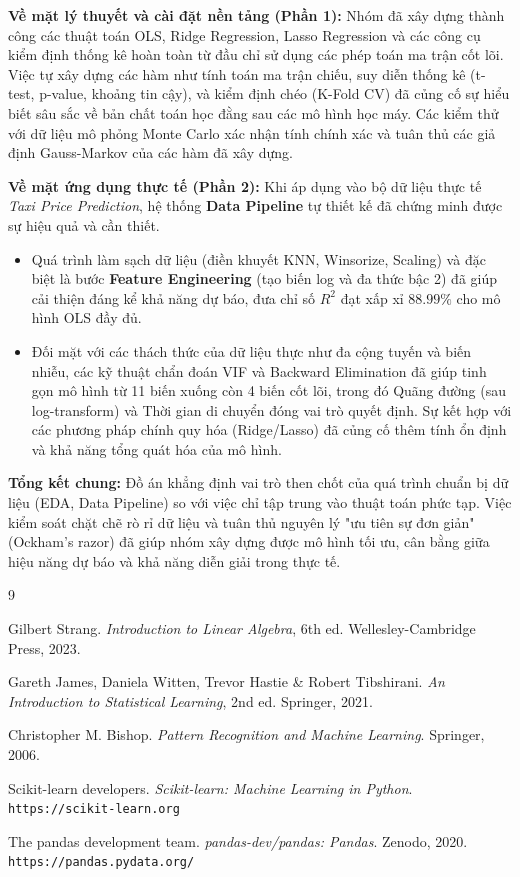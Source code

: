 \textbf{Về mặt lý thuyết và cài đặt nền tảng (Phần 1):} 
Nhóm đã xây dựng thành công các thuật toán OLS, Ridge Regression, Lasso Regression và các công cụ kiểm định thống kê hoàn toàn từ đầu chỉ sử dụng các phép toán ma trận cốt lõi. Việc tự xây dựng các hàm như tính toán ma trận chiếu, suy diễn thống kê (t-test, p-value, khoảng tin cậy), và kiểm định chéo (K-Fold CV) đã củng cố sự hiểu biết sâu sắc về bản chất toán học đằng sau các mô hình học máy. Các kiểm thử với dữ liệu mô phỏng Monte Carlo xác nhận tính chính xác và tuân thủ các giả định Gauss-Markov của các hàm đã xây dựng.

\textbf{Về mặt ứng dụng thực tế (Phần 2):} 
Khi áp dụng vào bộ dữ liệu thực tế \textit{Taxi Price Prediction}, hệ thống \textbf{Data Pipeline} tự thiết kế đã chứng minh được sự hiệu quả và cần thiết.
\begin{itemize}
    \item Quá trình làm sạch dữ liệu (điền khuyết KNN, Winsorize, Scaling) và đặc biệt là bước \textbf{Feature Engineering} (tạo biến log và đa thức bậc 2) đã giúp cải thiện đáng kể khả năng dự báo, đưa chỉ số $R^2$ đạt xấp xỉ $88.99\%$ cho mô hình OLS đầy đủ.
    \item Đối mặt với các thách thức của dữ liệu thực như đa cộng tuyến và biến nhiễu, các kỹ thuật chẩn đoán VIF và Backward Elimination đã giúp tinh gọn mô hình từ 11 biến xuống còn 4 biến cốt lõi, trong đó Quãng đường (sau log-transform) và Thời gian di chuyển đóng vai trò quyết định. Sự kết hợp với các phương pháp chính quy hóa (Ridge/Lasso) đã củng cố thêm tính ổn định và khả năng tổng quát hóa của mô hình.
\end{itemize}

\textbf{Tổng kết chung:}
Đồ án khẳng định vai trò then chốt của quá trình chuẩn bị dữ liệu (EDA, Data Pipeline) so với việc chỉ tập trung vào thuật toán phức tạp. Việc kiểm soát chặt chẽ rò rỉ dữ liệu và tuân thủ nguyên lý "ưu tiên sự đơn giản" (Ockham's razor) đã giúp nhóm xây dựng được mô hình tối ưu, cân bằng giữa hiệu năng dự báo và khả năng diễn giải trong thực tế.


\newpage
\renewcommand{\refname}{Tài liệu tham khảo}
\begin{thebibliography}{9}

Gilbert Strang. 
\textit{Introduction to Linear Algebra}, 6th ed. Wellesley-Cambridge Press, 2023.

Gareth James, Daniela Witten, Trevor Hastie \& Robert Tibshirani. 
\textit{An Introduction to Statistical Learning}, 2nd ed. Springer, 2021.

Christopher M. Bishop. 
\textit{Pattern Recognition and Machine Learning}. Springer, 2006.

Scikit-learn developers. 
\textit{Scikit-learn: Machine Learning in Python}. \texttt{https://scikit-learn.org}

The pandas development team. 
\textit{pandas-dev/pandas: Pandas}. Zenodo, 2020. \texttt{https://pandas.pydata.org/}

\end{thebibliography}
